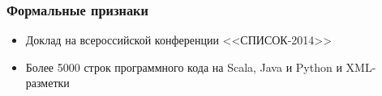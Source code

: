 \documentclass{beamer}
\let\otp\titlepage
\renewcommand{\titlepage}{\otp\addtocounter{framenumber}{-1}}
\begin{document}
\begin{frame}\frametitle{Формальные признаки}
\begin{itemize}
    \item Доклад на всероссийской конференции <<СПИСОК-2014>>
    \item Более 5000 строк программного кода на Scala, Java и Python и XML-разметки
\end{itemize}
\end{frame}


  {
\frame{\titlepage}
}
\end{document}
